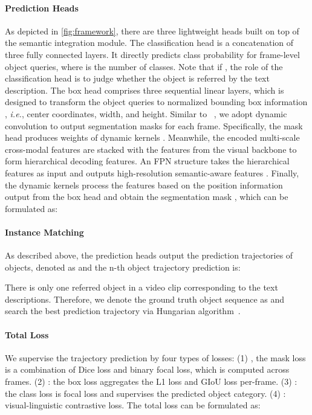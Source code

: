 \documentclass{article}
\begin{document}
\paragraph{Prediction Heads}
As depicted in \cref{fig:framework}, there are three lightweight heads built on top of the semantic integration module. 
The classification head is a concatenation of three fully connected layers. It directly predicts class probability  for frame-level object queries, where  is the number of classes. Note that if , the role of the classification head is to judge whether the object is referred by  the text description. 
The box head comprises three sequential linear layers, which is designed to transform the object queries to normalized bounding box information , \textit{i.e.}, center coordinates, width, and height. 
Similar to ~\cite{referformer}, we adopt dynamic convolution to output segmentation masks for each frame. Specifically, the mask head produces weights of  dynamic kernels . Meanwhile, 
the encoded multi-scale cross-modal features  are stacked with the  features from the visual backbone to form hierarchical decoding features.
An FPN structure takes the hierarchical features as input and outputs high-resolution semantic-aware features .
Finally, the dynamic kernels process the features  based on the position information output from the box head and obtain the segmentation mask , which can be formulated as:


\vspace{-5pt}
\paragraph{Instance Matching}
As described above, the prediction heads output the prediction trajectories of  objects, denoted as  and the n-th object trajectory prediction is:

There is only one referred object in a video clip corresponding to the text descriptions. Therefore, we denote the ground truth object sequence as  and search the best prediction trajectory  via Hungarian algorithm~\cite{hungarian}. 

\vspace{-5pt}
\paragraph{Total Loss}
We supervise the trajectory prediction  by four types of losses: (1) , the mask loss is a combination of Dice loss and binary focal loss, which is computed across frames. (2) : the box loss aggregates the L1 loss and GIoU loss per-frame. (3) : the class loss is focal loss and  supervises the predicted object category. (4) : visual-linguistic contrastive loss.
The total loss can be formulated as:
\end{document}
